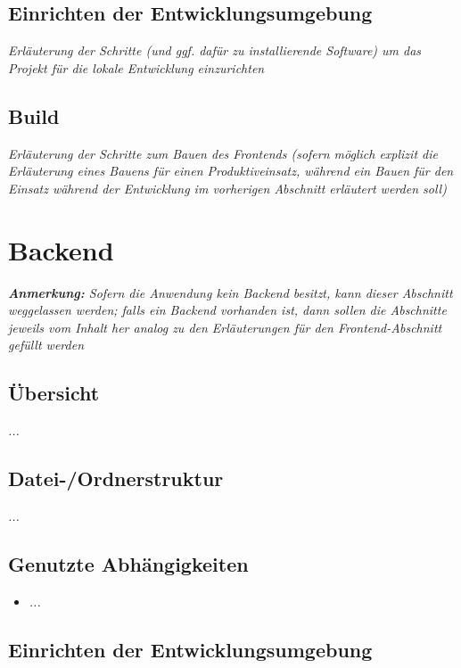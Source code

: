 \documentclass[a4paper,10pt]{scrartcl}
\begin{document}
\subsection{Einrichten der Entwicklungsumgebung}

\textit{Erläuterung der Schritte (und ggf. dafür zu installierende Software) um das Projekt für die lokale Entwicklung einzurichten}

\subsection{Build}

\textit{Erläuterung der Schritte zum Bauen des Frontends (sofern möglich explizit die Erläuterung eines Bauens für einen Produktiveinsatz, während ein Bauen für den Einsatz während der Entwicklung im vorherigen Abschnitt erläutert werden soll)}

\newpage

\section{Backend}

\textit{\textbf{Anmerkung:} Sofern die Anwendung kein Backend besitzt, kann dieser Abschnitt weggelassen werden; falls ein Backend vorhanden ist, dann sollen die Abschnitte jeweils vom Inhalt her analog zu den Erläuterungen für den Frontend-Abschnitt gefüllt werden}

\subsection{Übersicht}

\textit{...}

\subsection{Datei-/Ordnerstruktur}

\textit{...}

\subsection{Genutzte Abhängigkeiten}

\begin{itemize}
    \item \textit{...}
\end{itemize}

\subsection{Einrichten der Entwicklungsumgebung}
\end{document}
